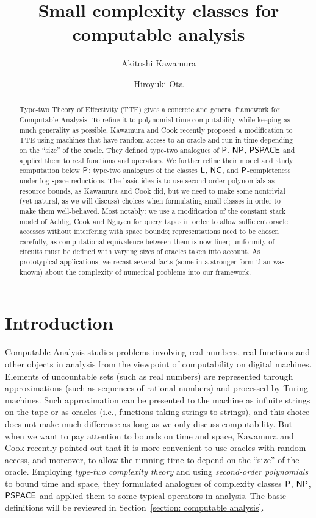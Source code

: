 \documentclass[a4paper,UKenglish]{lipics}
\title{Small complexity classes for computable analysis}
\author{Akitoshi Kawamura}
\author{Hiroyuki Ota}
\affil{University of Tokyo}
\begin{document}
\maketitle

\begin{abstract}
Type-two Theory of Effectivity (TTE) gives a concrete and general framework for 
Computable Analysis. 
To refine it to polynomial-time computability 
while keeping as much generality as possible, 
Kawamura and Cook recently proposed a modification to TTE using 
machines that have random access to an oracle and 
run in time depending on the ``size'' of the oracle. 
They defined type-two analogues of 
$\mathsf{P}$, $\mathsf{NP}$, $\mathsf{PSPACE}$ 
and applied them to real functions and operators. 
We further refine their model and study computation below $\mathsf{P}$: 
type-two analogues of 
the classes $\mathsf{L}$, 
$\mathsf{NC}$, 
and $\mathsf{P}$-completeness under log-space reductions.
The basic idea is 
to use second-order polynomials as resource bounds, 
as Kawamura and Cook did, 
but we need to make some nontrivial (yet natural, as we will discuss) choices
when formulating small classes
in order to make them well-behaved. 
Most notably: 
we use a modification of the constant stack model 
of Aehlig, Cook and Nguyen for query tapes 
in order to allow sufficient oracle accesses without interfering with space bounds; 
representations need to be chosen carefully, as 
computational equivalence between them is now finer; 
uniformity of circuits must be defined 
with varying sizes of oracles taken into account. 
As prototypical applications, 
we recast several facts (some in a stronger form than was known) 
about the complexity of numerical problems 
into our framework. 
\end{abstract}

\section{Introduction}

Computable Analysis 
\cite{bhw,ko1991complexity,weihrauch00:_comput_analy}
studies problems 
involving real numbers, real functions and other objects in analysis
from the viewpoint of computability on digital machines. 
Elements of uncountable sets (such as real numbers) are
represented through approximations (such as sequences of rational numbers)
and processed by Turing machines. 
Such approximation can be 
presented to the machine 
as infinite strings on the tape 
or as oracles (i.e., functions taking strings to strings), 
and this choice does not make much difference 
as long as we only discuss computability. 
But when we want to pay attention to bounds on time and space, 
Kawamura and Cook \cite{kawamura2012complexity} recently pointed out that 
it is more convenient to use oracles with random access, 
and moreover, to allow the running time 
to depend on the ``size'' of the oracle. 
Employing \emph{type-two complexity theory} and 
using \emph{second-order polynomials} to bound time and space, 
they formulated analogues of complexity classes 
$\mathsf{P}$, $\mathsf{NP}$, $\mathsf{PSPACE}$ and 
applied them to some typical operators in analysis. 
The basic definitions will be reviewed in Section~\ref{section: computable analysis}. 
\end{document}

